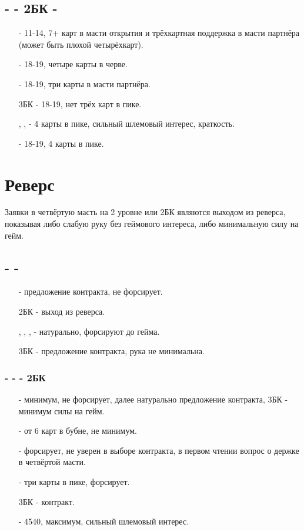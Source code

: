 \documentclass{article}
\begin{document}
\subsection{ -  - 2БК - }
\begin{enumerate}
    \item[\di{3}] - 11-14, 7+ карт в масти открытия и трёхкартная поддержка в масти партнёра (может быть плохой четырёхкарт).
    \item[\he{3}] - 18-19, четыре карты в черве.
    \item[\sp{3}] - 18-19, три карты в масти партнёра.
    \item[3БК] - 18-19, нет трёх карт в пике.
    \item[\cl{4}, \di{4}, \he{4}] - 4 карты в пике, сильный шлемовый интерес, краткость.
    \item[\sp{4}] - 18-19, 4 карты в пике.
\end{enumerate}
\section{Реверс}
Заявки в четвёртую масть на 2 уровне или 2БК являются выходом из реверса, показывая либо слабую руку без геймового интереса, либо минимальную силу на гейм.
\subsection{ -  - }
\begin{enumerate}
    \item[\sp{2}] - предложение контракта, не форсирует.
    \item[2БК] - выход из реверса.
    \item[\cl{3}, \di{3}, \he{3}, \sp{3}] - натурально, форсируют до гейма.
    \item[3БК] - предложение контракта, рука не минимальна.
\end{enumerate}
\subsubsection{ -  -  - 2БК}
\begin{enumerate}
    \item[\cl{3}] - минимум, не форсирует, далее натурально предложение контракта, 3БК - минимум силы на гейм.
    \item[\di{3}] - от 6 карт в бубне, не минимум.
    \item[\he{3}] - форсирует, не уверен в выборе контракта, в первом чтении вопрос о держке в четвёртой масти.
    \item[\sp{3}] - три карты в пике, форсирует.
    \item[3БК] - контракт.
    \item[\cl{4}] - 4\cl{}5\di{}4\he{}0\sp{}, максимум, сильный шлемовый интерес.
\end{enumerate}
\end{document}
